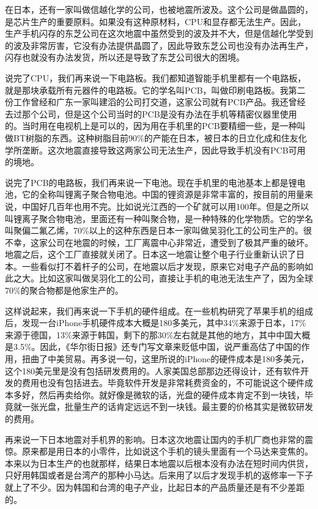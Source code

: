 \documentclass[
  letterpaper,
  DIV=11,
  numbers=noendperiod]{scrreprt}
\begin{document}
在日本，还有一家叫做信越化学的公司，也被地震所波及。这个公司是做晶圆的，是芯片生产的重要原料。如果没有这种原材料，CPU和显存都无法生产。因此，生产手机闪存的东芝公司在这次地震中虽然受到的波及并不大，但是信越化学受到的波及非常厉害，它没有办法提供晶圆了，因此导致东芝公司也没有办法再生产，闪存也就没有办法发货，所以还是导致了东芝公司很大的困境。

说完了CPU，我们再来说一下电路板。我们都知道智能手机里都有一个电路板，就是那块承载所有元器件的电路板。它的学名叫PCB，叫做印刷电路板。我第二份工作曾经和广东一家叫建滔的公司打交道，这家公司就有PCB产品。我还曾经去过那个公司，但是这个公司当时的PCB是没有办法在手机等精密仪器里使用的。当时用在电视机上是可以的，因为用在手机里的PCB要精细一些，是一种叫做BT树脂的东西。这种树脂目前90\%的产能在日本，被日本的日立化成和住友化学所垄断。这次地震直接导致这两家公司无法生产，因此导致手机没有PCB可用的境地。

说完了PCB的电路板，我们再来说一下电池。现在手机里的电池基本上都是锂电池，它的全称叫锂离子聚合物电池。中国的锂资源是非常丰富的，按目前的用量来说，中国好几百年也用不完。比如说光江西的一个矿就可以用100年。但是之所以叫锂离子聚合物电池，里面还有一种叫聚合物，是一种特殊的化学物质。它的学名叫聚偏二氟乙烯，70\%以上的这种东西是日本一家叫做吴羽化工的公司生产的。很不幸，这家公司在地震的时候，工厂离震中心非常近，遭受到了极其严重的破坏。地震之后，这个工厂直接就关闭了。日本这一地震让整个电子行业重新认识了日本。一些看似打不着杆子的公司，在地震以后才发现，原来它对电子产品的影响如此之大。比如这家叫做吴羽化工的公司，直接让手机的电池无法生产了，因为全球70\%的聚合物都是他家生产的。

这样说起来，我们再来说一下手机的硬件组成。在一些机构研究了苹果手机的组成后，发现一台iPhone手机硬件成本大概是180多美元，其中34\%来源于日本，17\%来源于德国，13\%来源于韩国，剩下的那30\%左右就是其他的地方，其中中国大概是3.5\%。因此，《华尔街日报》还专门写文章来贬低中国，说严重高估了中国的作用，扭曲了中美贸易。再多说一句，这里所说的iPhone的硬件成本是180多美元，这个180美元里是没有包括研发费用的。人家美国总部那边还得设计，还有软件开发的费用也没有包括进去。毕竟软件开发是非常耗费资金的，不可能说这个硬件成本多好，然后再卖给你。就好像是微软的话，光盘的硬件成本肯定不到一块钱，毕竟就一张光盘，批量生产的话肯定远远不到一块钱。最主要的价格其实是微软研发的费用。

再来说一下日本地震对手机界的影响。日本这次地震让国内的手机厂商也非常的震惊。原来都是用日本的小零件，比如说这个手机的镜头里面有一个马达来变焦的。本来以为日本生产的也就那样，结果日本地震以后根本没有办法在短时间内供货，只好用韩国或者是台湾产的那种小马达。后来用了以后才发现手机的返修率一下子就上了不少。因为韩国和台湾的电子产业，比起日本的产品质量还是有不少差距的。
\end{document}

